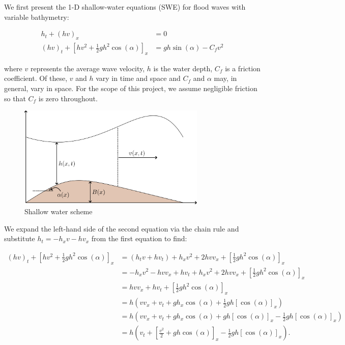We first present the 1-D shallow-water equations (SWE) for flood waves with variable bathymetry\cite{whitham1999_ch3}:

\begin{align*}
    h_t + (h v)_x &= 0 \\
    (h v)_t + \left[ hv^2 + \frac{1}{2} g h^2 \cos{(\alpha)} \right]_x &= g h \sin{(\alpha)} - C_f v^2
\end{align*}

where $v$ represents the average wave velocity, $h$ is the water depth, $C_f$ is a friction coefficient. Of these, $v$ 
and $h$ vary in time and space and $C_f$ and $\alpha$ may, in general, vary in space. For the scope of this project, we 
assume negligible friction so that $C_f$ is zero throughout. 

\begin{figure}[h]
    \centering
    \includegraphics[width=0.8\textwidth]{images/swe_diagram.png}
    \caption{Shallow water scheme}
\end{figure}

\pagebreak
We expand the left-hand side of the second equation via the
chain rule and substitute $h_t = -h_x v - h v_x$ from the first equation to find: 

\begin{align*}
    (h v)_t + \left[ hv^2 + \frac{1}{2} g h^2 \cos{(\alpha)} \right]_x 
        &= \left( h_t v + h v_t \right) + h_x v^2 + 2 h v v_x + \left[ \frac{1}{2} g h^2 \cos{(\alpha)} \right]_x \\
        &= -h_x v^2 - h v v_x + h v_t + h_x v^2 + 2 h v v_x + \left[ \frac{1}{2} g h^2 \cos{(\alpha)} \right]_x \\
        &=  h v v_x + h v_t + \left[ \frac{1}{2} g h^2 \cos{(\alpha)} \right]_x \\
        &=  h \left( v v_x + v_t + g h_x \cos{(\alpha)} + \frac{1}{2} g h [\cos{(\alpha)}]_x \right) \\
        &=  h \left( v v_x + v_t + g h_x \cos{(\alpha)} + g h [\cos{(\alpha)}]_x - \frac{1}{2} g h [\cos{(\alpha)}]_x \right) \\
        &=  h \left( v_t + \left[ \frac{v^2}{2} + g h \cos{(\alpha)} \right]_x - \frac{1}{2} g h [\cos{(\alpha)}]_x \right).
\end{align*}

